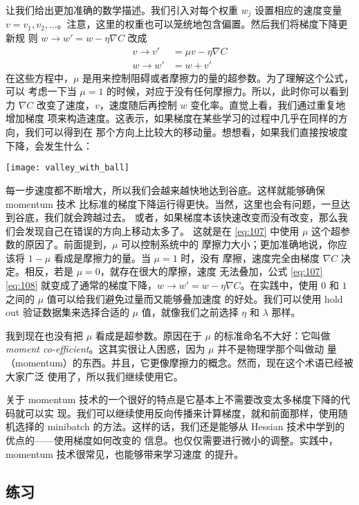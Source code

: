 让我们给出更加准确的数学描述。我们引入对每个权重 $w_j$ 设置相应的速度变量
$v=v_1,v_2,...$。注意，这里的权重也可以笼统地包含偏置。然后我们将梯度下降更新规
则 $w\rightarrow w'=w-\eta\nabla C$ 改成
\begin{align} 
  v \rightarrow v' &= \mu v - \eta \nabla C \label{eq:107}\tag{107}\\
  w \rightarrow w' &= w+v' \label{eq:108}\tag{108}
\end{align}
在这些方程中，$\mu$ 是用来控制阻碍或者摩擦力的量的超参数。为了理解这个公式，可以
考虑一下当 $\mu=1$ 的时候，对应于没有任何摩擦力。所以，此时你可以看到力 $\nabla
C$ 改变了速度，$v$，速度随后再控制 $w$ 变化率。直觉上看，我们通过重复地增加梯度
项来构造速度。这表示，如果梯度在某些学习的过程中几乎在同样的方向，我们可以得到在
那个方向上比较大的移动量。想想看，如果我们直接按坡度下降，会发生什么：
\begin{center}
  \texttt{[image: valley\_with\_ball]}
\end{center}

每一步速度都不断增大，所以我们会越来越快地达到谷底。这样就能够确保 momentum 技术
比标准的梯度下降运行得更快。当然，这里也会有问题，一旦达到谷底，我们就会跨越过去。
或者，如果梯度本该快速改变而没有改变，那么我们会发现自己在错误的方向上移动太多了。
这就是在 \eqref{eq:107} 中使用 $\mu$ 这个超参数的原因了。前面提到，$\mu$ 可以控制系统中的
摩擦力大小；更加准确地说，你应该将 $1-\mu$ 看成是摩擦力的量。当 $\mu=1$ 时，没有
摩擦，速度完全由梯度 $\nabla C$ 决定。相反，若是 $\mu=0$，就存在很大的摩擦，速度
无法叠加，公式 \eqref{eq:107} \eqref{eq:108} 就变成了通常的梯度下降，$w\rightarrow w'=w-\eta \nabla
C$。在实践中，使用 $0$ 和 $1$ 之间的 $\mu$ 值可以给我们避免过量而又能够叠加速度
的好处。我们可以使用 hold out 验证数据集来选择合适的 $\mu$ 值，就像我们之前选择
$\eta$ 和 $\lambda$ 那样。

我到现在也没有把 $\mu$ 看成是超参数。原因在于 $\mu$ 的标准命名不大好：它叫做
\emph{moment co-efficient}。这其实很让人困惑，因为 $\mu$ 并不是物理学那个叫做动
量（momentum）的东西。并且，它更像摩擦力的概念。然而，现在这个术语已经被大家广泛
使用了，所以我们继续使用它。

关于 momentum 技术的一个很好的特点是它基本上不需要改变太多梯度下降的代码就可以实
现。我们可以继续使用反向传播来计算梯度，就和前面那样，使用随机选择的 minibatch
的方法。这样的话，我们还是能够从 Hessian 技术中学到的优点的——使用梯度如何改变的
信息。也仅仅需要进行微小的调整。实践中，momentum 技术很常见，也能够带来学习速度
的提升。

\subsection*{练习}

